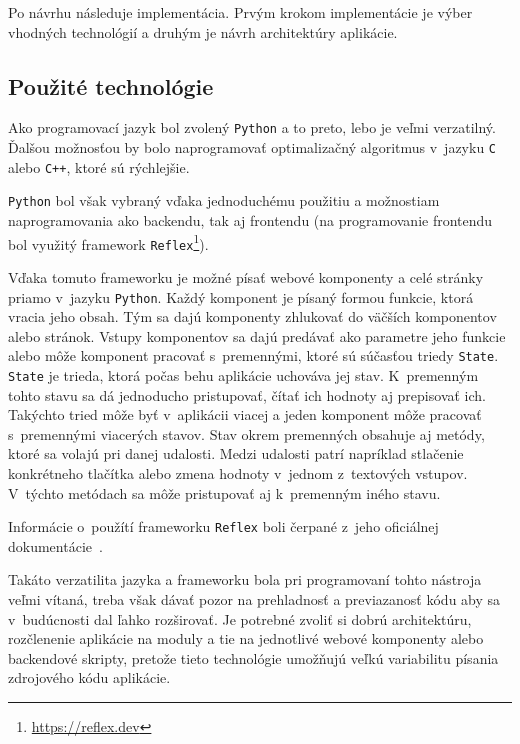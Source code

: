 Po návrhu následuje implementácia.
Prvým krokom implementácie je výber vhodných technológií a druhým je návrh architektúry aplikácie.

\subsection*{Použité technológie}
Ako programovací jazyk bol zvolený \texttt{Python} a to preto, lebo je veľmi verzatilný.
Ďalšou možnosťou by bolo naprogramovať optimalizačný algoritmus v~jazyku \texttt{C} alebo \texttt{C++}, ktoré sú rýchlejšie.

\texttt{Python} bol však vybraný vďaka jednoduchému použitiu a možnostiam naprogramovania ako backendu, tak aj frontendu (na programovanie frontendu bol využitý framework \texttt{Reflex}\footnote{\url{https://reflex.dev}}).

Vďaka tomuto frameworku je možné písať webové komponenty a celé stránky priamo v~jazyku \texttt{Python}.
Každý komponent je písaný formou funkcie, ktorá vracia jeho obsah.
Tým sa dajú komponenty zhlukovať do väčších komponentov alebo stránok.
Vstupy komponentov sa dajú predávať ako parametre jeho funkcie alebo môže komponent pracovať s~premennými, ktoré sú súčasťou triedy \texttt{State}.
\texttt{State} je trieda, ktorá počas behu aplikácie uchováva jej stav.
K~premenným tohto stavu sa dá jednoducho pristupovať, čítať ich hodnoty aj prepisovať ich.
Takýchto tried môže byť v~aplikácii viacej a jeden komponent môže pracovať s~premennými viacerých stavov.
Stav okrem premenných obsahuje aj metódy, ktoré sa volajú pri danej udalosti.
Medzi udalosti patrí napríklad stlačenie konkrétneho tlačítka alebo zmena hodnoty v~jednom z~textových vstupov.
V~týchto metódach sa môže pristupovať aj k~premenným iného stavu.               

Informácie o~použítí frameworku \texttt{Reflex} boli čerpané z~jeho oficiálnej dokumentácie~\cite{reflex_docs}.

Takáto verzatilita jazyka a frameworku bola pri programovaní tohto nástroja veľmi vítaná,
treba však dávať pozor na prehladnosť a previazanosť kódu aby sa v~budúcnosti dal ľahko rozširovať.
Je potrebné zvoliť si dobrú architektúru, rozčlenenie aplikácie na moduly a tie na jednotlivé webové komponenty alebo backendové skripty, pretože tieto technológie umožňujú veľkú variabilitu písania zdrojového kódu aplikácie.

\newpage
